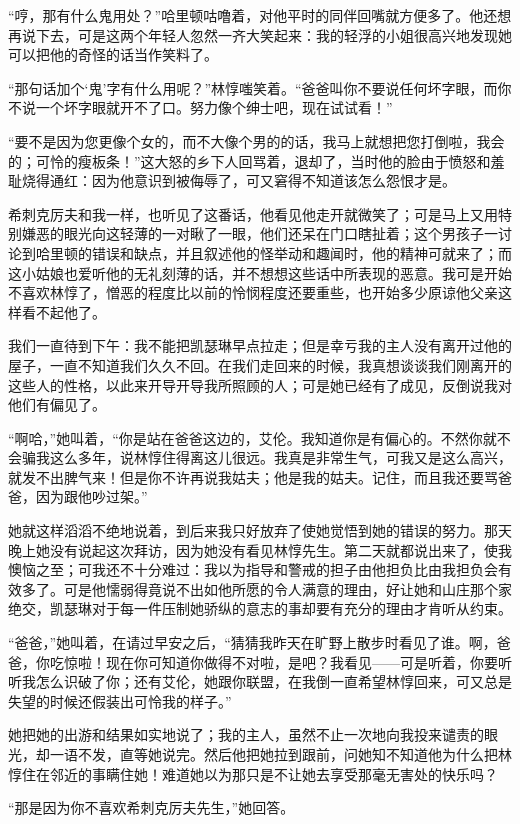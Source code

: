 \par “哼，那有什么鬼用处？”哈里顿咕噜着，对他平时的同伴回嘴就方便多了。他还想再说下去，可是这两个年轻人忽然一齐大笑起来：我的轻浮的小姐很高兴地发现她可以把他的奇怪的话当作笑料了。
\par “那句话加个‘鬼’字有什么用呢？”林惇嗤笑着。“爸爸叫你不要说任何坏字眼，而你不说一个坏字眼就开不了口。努力像个绅士吧，现在试试看！”
\par “要不是因为您更像个女的，而不大像个男的的话，我马上就想把您打倒啦，我会的；可怜的瘦板条！”这大怒的乡下人回骂着，退却了，当时他的脸由于愤怒和羞耻烧得通红：因为他意识到被侮辱了，可又窘得不知道该怎么怨恨才是。
\par 希刺克厉夫和我一样，也听见了这番话，他看见他走开就微笑了；可是马上又用特别嫌恶的眼光向这轻薄的一对瞅了一眼，他们还呆在门口瞎扯着；这个男孩子一讨论到哈里顿的错误和缺点，并且叙述他的怪举动和趣闻时，他的精神可就来了；而这小姑娘也爱听他的无礼刻薄的话，并不想想这些话中所表现的恶意。我可是开始不喜欢林惇了，憎恶的程度比以前的怜悯程度还要重些，也开始多少原谅他父亲这样看不起他了。
\par 我们一直待到下午：我不能把凯瑟琳早点拉走；但是幸亏我的主人没有离开过他的屋子，一直不知道我们久久不回。在我们走回来的时候，我真想谈谈我们刚离开的这些人的性格，以此来开导开导我所照顾的人；可是她已经有了成见，反倒说我对他们有偏见了。
\par “啊哈，”她叫着，“你是站在爸爸这边的，艾伦。我知道你是有偏心的。不然你就不会骗我这么多年，说林惇住得离这儿很远。我真是非常生气，可我又是这么高兴，就发不出脾气来！但是你不许再说我姑夫；他是我的姑夫。记住，而且我还要骂爸爸，因为跟他吵过架。”
\par 她就这样滔滔不绝地说着，到后来我只好放弃了使她觉悟到她的错误的努力。那天晚上她没有说起这次拜访，因为她没有看见林惇先生。第二天就都说出来了，使我懊恼之至；可我还不十分难过：我以为指导和警戒的担子由他担负比由我担负会有效多了。可是他懦弱得竟说不出如他所愿的令人满意的理由，好让她和山庄那个家绝交，凯瑟琳对于每一件压制她骄纵的意志的事却要有充分的理由才肯听从约束。
\par “爸爸，”她叫着，在请过早安之后，“猜猜我昨天在旷野上散步时看见了谁。啊，爸爸，你吃惊啦！现在你可知道你做得不对啦，是吧？我看见——可是听着，你要听听我怎么识破了你；还有艾伦，她跟你联盟，在我倒一直希望林惇回来，可又总是失望的时候还假装出可怜我的样子。”
\par 她把她的出游和结果如实地说了；我的主人，虽然不止一次地向我投来谴责的眼光，却一语不发，直等她说完。然后他把她拉到跟前，问她知不知道他为什么把林惇住在邻近的事瞒住她！难道她以为那只是不让她去享受那毫无害处的快乐吗？
\par “那是因为你不喜欢希刺克厉夫先生，”她回答。
